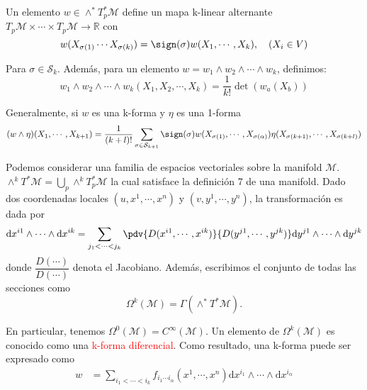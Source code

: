 \documentclass[../main]{subfiles}
\begin{document}
Un elemento $w \in \wedge^* T^*_p \mathcal{M}$ define un mapa k-linear alternante $T_p \mathcal{M} \times \cdots \times T_p \mathcal{M} \rightarrow \mathbb{R}$ con 
\begin{equation}
    w(X_{\sigma(1)} \cdots X_{\sigma(k)})=\sign(\sigma) w(X_1, \cdots, X_k),\quad (X_i \in V)
\end{equation}

Para $\sigma \in \mathcal{S}_k$. Además, para un elemento $w=w_1\wedge w_2\wedge \cdots \wedge w_k$, definimos:
\begin{equation}
    w_1\wedge w_2\wedge \cdots \wedge w_k(X_1, X_2, \cdots, X_k)=\dfrac{1}{k!}\det(w_a(X_b))
\end{equation}

Generalmente, si $w$ es una k-forma y $\eta$ es una 1-forma 
\begin{equation}
    (w \wedge \eta)(X_1, \cdots, X_{k+1})=\dfrac{1}{(k+l)!}\sum_{\sigma \in \mathcal{S}_{k+1}} \sign(\sigma) w(X_{\sigma(1)}, \cdots, X_{\sigma(\alpha)})\eta(X_{\sigma(k+1)}, \cdots, X_{\sigma(k+l)})
\end{equation}

Podemos considerar una familia de espacios vectoriales sobre la manifold $\mathcal{M}$. $\wedge^k T^* \mathcal{M}=\bigcup_p \wedge^k T^*_p \mathcal{M}$ la cual satisface la definición 7 de una manifold.  Dado dos coordenadas locales $(u, x^1, \cdots, x^n)$ y $(v, y^1, \cdots, y^n)$, la transformación es dada por 
\begin{equation}
    \mathrm{d}x^{i1}\wedge \cdots \wedge \mathrm{d}x^{ik}=\sum_{j_1 < \cdots <j_k} \pdv{D(x^{i1}, \cdots, x^{ik})}{D(y^{j1}, \cdots, y^{jk})} \mathrm{d}y^{j1} \wedge \cdots \wedge \mathrm{d}y^{jk}
\end{equation}
donde $\displaystyle \dfrac{D(\cdots)}{D(\cdots)}$ denota el Jacobiano. Además, escribimos el conjunto de todas las secciones como 
\begin{equation}
    \Omega^k(\mathcal{M})=\Gamma(\wedge^* T^* \mathcal{M}).
\end{equation}

En particular, tenemos $\Omega^0(\mathcal{M})=C^{\infty}(\mathcal{M})$. Un elemento de $\Omega^k(\mathcal{M})$ es conocido como una \textcolor{red}{k-forma diferencial}. Como resultado, una k-forma puede ser expresado como 
\begin{equation}
    \begin{split}
        w&=\sum_{i_1<\cdots <i_k}f_{i_1\cdots i_{\alpha}}(x^1, \cdots, x^n)\mathrm{d}x^{i_1}\wedge \cdots \wedge \mathrm{d}x^{i_{\alpha}}
    \end{split}
\end{equation}
\end{document}

